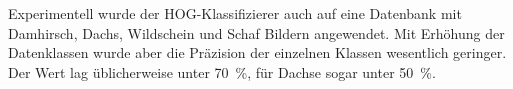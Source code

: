 Experimentell wurde der HOG-Klassifizierer auch auf eine Datenbank mit Damhirsch, Dachs, Wildschein und Schaf Bildern angewendet. Mit Erhöhung der Datenklassen wurde aber die Präzision der einzelnen Klassen wesentlich geringer. Der Wert lag üblicherweise unter 70~\%, für Dachse sogar unter 50~\%.



